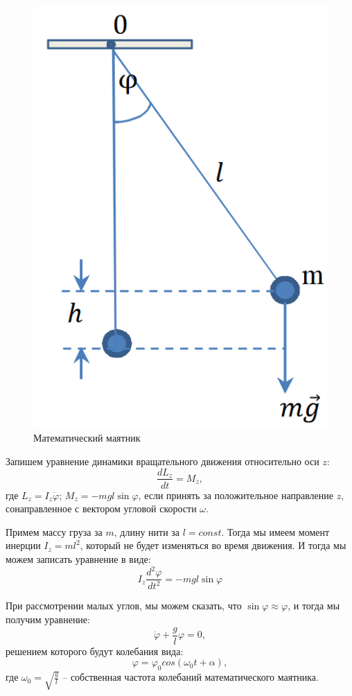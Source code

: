 \documentclass[a4paper,12pt]{article}
\begin{document}
\begin{figure}[h!]
	\begin{center}
		\includegraphics[scale=0.5]{1}
	\end{center}
	\caption{Математический маятник}
\end{figure}

Запишем уравнение динамики вращательного движения относительно оси $z$:
$$\frac{dL_z}{dt} = M_z,$$
где $L_z = I_z\dot\varphi$; $M_z = -mgl\sin\varphi$, если принять за положительное направление $z$, сонаправленное с вектором угловой скорости $\omega$.

Примем массу груза за $m$, длину нити за $l = const$. Тогда мы имеем момент инерции $I_z = ml^2$, который не будет изменяться во время движения. И тогда мы можем записать уравнение в виде:
$$I_z \frac{d^2\varphi}{dt^2} = -mgl\sin\varphi$$

При рассмотрении малых углов, мы можем сказать, что $\sin\varphi \approx \varphi$, и тогда мы получим уравнение:
$$\ddot{\varphi} + \frac{g}{l}\varphi = 0,$$
решением которого будут колебания вида:
$$\varphi = \varphi_0cos(\omega_0t+\alpha),$$
где $\omega_0 = \sqrt{\frac{g}{l}}$ -- собственная частота колебаний математического маятника.
\end{document}
